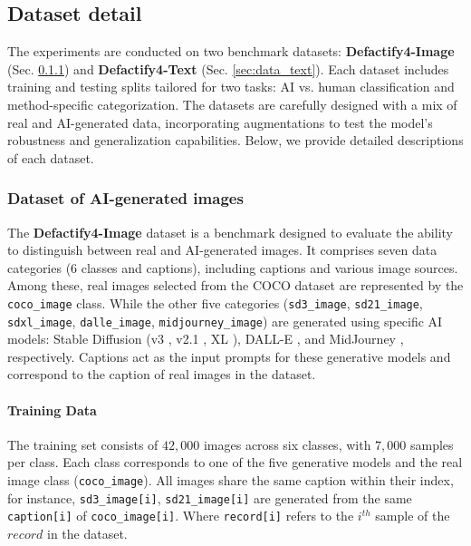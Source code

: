 \subsection{Dataset detail}
\label{sec:appendix_datasets}
The experiments are conducted on two benchmark datasets: \textbf{Defactify4-Image} (Sec. \ref{sec:data_img}) and \textbf{Defactify4-Text} (Sec. \ref{sec:data_text}). Each dataset includes training and testing splits tailored for two tasks: AI vs. human classification and method-specific categorization. The datasets are carefully designed with a mix of real and AI-generated data, incorporating augmentations to test the model’s robustness and generalization capabilities. Below, we provide detailed descriptions of each dataset.
\label{sec:dataset}
\subsubsection{Dataset of AI-generated images}
\label{sec:data_img}
The \textbf{Defactify4-Image} dataset is a benchmark designed to evaluate the ability to distinguish between real and AI-generated images. It comprises seven data categories (6 classes and captions),  including captions and various image sources. Among these, real images selected from the COCO dataset \cite{lin2014microsoft} are represented by the \texttt{coco\_image} class. While the other five categories (\texttt{sd3\_image}, \texttt{sd21\_image}, \texttt{sdxl\_image}, \texttt{dalle\_image}, \texttt{midjourney\_image}) are generated using specific AI models: Stable Diffusion (v3 \cite{esser2024scaling}, v2.1 \cite{rombach2022high}, XL \cite{podell2023sdxl}), DALL-E \cite{betker2023improving}, and MidJourney \cite{midjourney}, respectively. Captions act as the input prompts for these generative models and correspond to the caption of real images in the dataset.

\paragraph{Training Data}
The training set consists of $42,000$ images across six classes, with $7,000$ samples per class. Each class corresponds to one of the five generative models and the real image class (\texttt{coco\_image}). All images share the same caption within their index, for instance, \texttt{sd3\_image[i]}, \texttt{sd21\_image[i]} are generated from the same \texttt{caption[i]} of \texttt{coco\_image[i]}. Where \texttt{record[i]} refers to the $i^{th}$ sample of the $record$ in the dataset.

